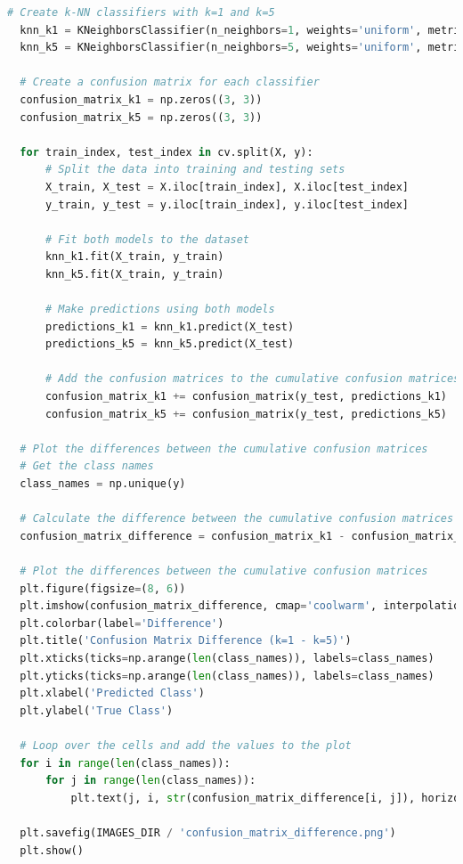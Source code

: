 \documentclass{article}
\begin{document}
\begin{lstlisting}[language=Python]
  # Create k-NN classifiers with k=1 and k=5
  knn_k1 = KNeighborsClassifier(n_neighbors=1, weights='uniform', metric='euclidean')
  knn_k5 = KNeighborsClassifier(n_neighbors=5, weights='uniform', metric='euclidean')

  # Create a confusion matrix for each classifier
  confusion_matrix_k1 = np.zeros((3, 3))
  confusion_matrix_k5 = np.zeros((3, 3))

  for train_index, test_index in cv.split(X, y):
      # Split the data into training and testing sets
      X_train, X_test = X.iloc[train_index], X.iloc[test_index]
      y_train, y_test = y.iloc[train_index], y.iloc[test_index]

      # Fit both models to the dataset
      knn_k1.fit(X_train, y_train)
      knn_k5.fit(X_train, y_train)

      # Make predictions using both models
      predictions_k1 = knn_k1.predict(X_test)
      predictions_k5 = knn_k5.predict(X_test)

      # Add the confusion matrices to the cumulative confusion matrices
      confusion_matrix_k1 += confusion_matrix(y_test, predictions_k1)
      confusion_matrix_k5 += confusion_matrix(y_test, predictions_k5)

  # Plot the differences between the cumulative confusion matrices
  # Get the class names
  class_names = np.unique(y)

  # Calculate the difference between the cumulative confusion matrices
  confusion_matrix_difference = confusion_matrix_k1 - confusion_matrix_k5

  # Plot the differences between the cumulative confusion matrices
  plt.figure(figsize=(8, 6))
  plt.imshow(confusion_matrix_difference, cmap='coolwarm', interpolation='nearest')
  plt.colorbar(label='Difference')
  plt.title('Confusion Matrix Difference (k=1 - k=5)')
  plt.xticks(ticks=np.arange(len(class_names)), labels=class_names)
  plt.yticks(ticks=np.arange(len(class_names)), labels=class_names)
  plt.xlabel('Predicted Class')
  plt.ylabel('True Class')

  # Loop over the cells and add the values to the plot
  for i in range(len(class_names)):
      for j in range(len(class_names)):
          plt.text(j, i, str(confusion_matrix_difference[i, j]), horizontalalignment='center', verticalalignment='center')
  
  plt.savefig(IMAGES_DIR / 'confusion_matrix_difference.png')
  plt.show()
\end{lstlisting}
\end{document}
